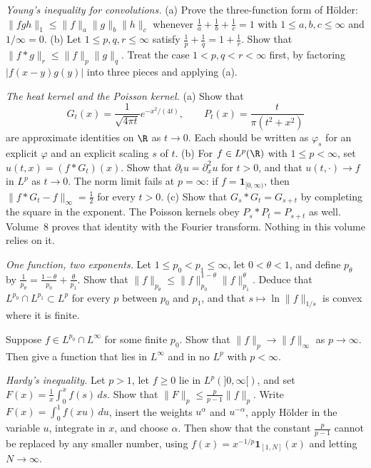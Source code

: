\begin{exercise}[$\star\star\star$]\label{ex:youngconv}
\emph{Young's inequality for convolutions.} (a) Prove the three-function form of Hölder: $\|fgh\|_1\le\|f\|_a\|g\|_b\|h\|_c$ whenever $\frac1a+\frac1b+\frac1c=1$ with $1\le a,b,c\le\infty$ and $1/\infty=0$. (b) Let $1\le p,q,r\le\infty$ satisfy $\frac1p+\frac1q=1+\frac1r$. Show that $\|f*g\|_r\le\|f\|_p\|g\|_q$. Treat the case $1<p,q<r<\infty$ first, by factoring $|f(x-y)g(y)|$ into three pieces and applying (a).
\end{exercise}

\begin{exercise}[$\star\star$]\label{ex:approxid}
\emph{The heat kernel and the Poisson kernel.} (a) Show that
\[G_t(x)=\frac1{\sqrt{4\pi t}}e^{-x^2/(4t)},\qquad P_t(x)=\frac{t}{\pi(t^2+x^2)}\]
are approximate identities on $\R$ as $t\to0$. Each should be written as $\varphi_s$ for an explicit $\varphi$ and an explicit scaling $s$ of $t$. (b) For $f\in L^p(\R)$ with $1\le p<\infty$, set $u(t,x)=(f*G_t)(x)$. Show that $\partial_tu=\partial_x^2u$ for $t>0$, and that $u(t,\cdot)\to f$ in $L^p$ as $t\to0$. The norm limit fails at $p=\infty$: if $f=\mathbf 1_{[0,\infty)}$, then $\|f*G_t-f\|_\infty=\frac12$ for every $t>0$. (c) Show that $G_s*G_t=G_{s+t}$ by completing the square in the exponent. The Poisson kernels obey $P_s*P_t=P_{s+t}$ as well. Volume~8 proves that identity with the Fourier transform. Nothing in this volume relies on it.
\end{exercise}

\begin{exercise}[$\star\star$]\label{ex:logconvex}
\emph{One function, two exponents.} Let $1\le p_0<p_1\le\infty$, let $0<\theta<1$, and define $p_\theta$ by $\frac1{p_\theta}=\frac{1-\theta}{p_0}+\frac\theta{p_1}$. Show that $\|f\|_{p_\theta}\le\|f\|_{p_0}^{1-\theta}\|f\|_{p_1}^\theta$. Deduce that $L^{p_0}\cap L^{p_1}\subset L^p$ for every $p$ between $p_0$ and $p_1$, and that $s\mapsto\ln\|f\|_{1/s}$ is convex where it is finite.
\end{exercise}

\begin{exercise}[$\star\star$]\label{ex:pinfty}
Suppose $f\in L^{p_0}\cap L^\infty$ for some finite $p_0$. Show that $\|f\|_p\to\|f\|_\infty$ as $p\to\infty$. Then give a function that lies in $L^\infty$ and in no $L^p$ with $p<\infty$.
\end{exercise}

\begin{exercise}[$\star\star\star$]\label{ex:hardy}
\emph{Hardy's inequality.} Let $p>1$, let $f\ge0$ lie in $L^p(]0,\infty[)$, and set $F(x)=\frac1x\int_0^xf(s)\,ds$. Show that $\|F\|_p\le\frac p{p-1}\|f\|_p$. Write $F(x)=\int_0^1 f(xu)\,du$, insert the weights $u^{\alpha}$ and $u^{-\alpha}$, apply Hölder in the variable $u$, integrate in $x$, and choose $\alpha$. Then show that the constant $\frac p{p-1}$ cannot be replaced by any smaller number, using $f(x)=x^{-1/p}\mathbf 1_{[1,N]}(x)$ and letting $N\to\infty$.
\end{exercise}

